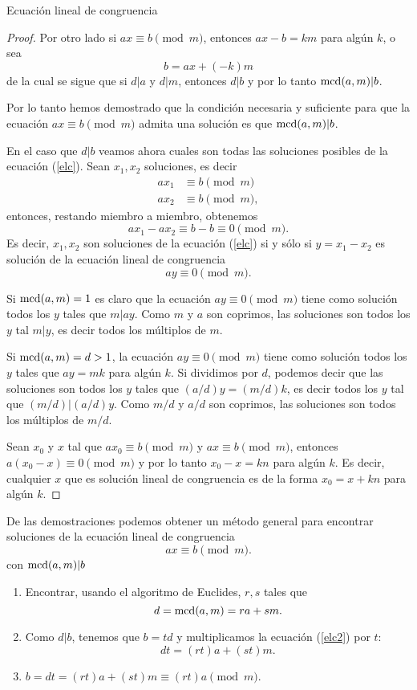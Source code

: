 \begin{section}{Ecuación lineal de congruencia}
\begin{proof}
Por otro lado si $ax\equiv b\pmod{m}$, entonces $ax-b=km$ para
algún $k$, o sea
$$
b=ax+(-k)m
$$
de la cual se sigue que si $d|a$ y $d|m$, entonces $d|b$ y por lo
tanto $\operatorname{mcd}(a,m)|b$.

Por lo tanto hemos demostrado que la condición necesaria y
suficiente para que la ecuación $ax\equiv b \pmod{m}$ admita una
solución es que $\operatorname{mcd}(a,m)|b$.

En el caso que $d|b$ veamos ahora cuales son todas las soluciones posibles de la ecuación (\ref{elc}). Sean $x_1,x_2$ soluciones, es decir
\begin{align*}
ax_1 &\equiv b \pmod{m} \\
ax_2 &\equiv b \pmod{m},
\end{align*}
entonces, restando miembro a miembro, obtenemos
$$
ax_1 -ax_2 \equiv b - b \equiv 0 \pmod{m}.
$$
Es decir, $x_1,x_2$ son soluciones de la ecuación (\ref{elc}) si y sólo si  $y = x_1 -x_2$ es solución de la ecuación lineal de congruencia
\begin{equation}\label{elc0}
ay \equiv 0 \pmod{m}.
\end{equation}

Si $\operatorname{mcd}(a,m) =1$ es claro que la ecuación $ay \equiv 0 \pmod{m}$ tiene como solución todos los $y$ tales que $m|ay$. Como $m$ y $a$ son  coprimos, las soluciones son todos los $y$ tal $m|y$, es decir todos los múltiplos de $m$.

Si $\operatorname{mcd}(a,m) =d > 1$,  la ecuación $ay \equiv 0 \pmod{m}$ tiene como solución todos los $y$ tales que $ay=mk$ para algún $k$. Si dividimos por $d$, podemos decir que las soluciones son todos los $y$ tales que $(a/d)y = (m/d)k$, es decir todos los $y$ tal que $(m/d)|(a/d)y$. Como $m/d$ y $a/d$ son coprimos, las soluciones son todos los múltiplos de $m/d$.

Sean $x_0$ y $x$ tal que $ax_0 \equiv b \pmod{m}$ y $ax \equiv b \pmod{m}$, entonces $a(x_0-x) \equiv 0 \pmod{m}$ y por lo tanto $x_0-x = kn$ para algún $k$. Es decir, cualquier $x$ que es solución lineal de congruencia es de la forma $x_0 = x+kn$ para algún $k$.
\end{proof}

De las demostraciones podemos obtener un método general para encontrar soluciones de la ecuación lineal de congruencia
$$
ax \equiv b \pmod{m}.
$$
con $\operatorname{mcd}(a,m)|b$


\begin{enumerate}[label=(\alph*)]
\item  Encontrar, usando el algoritmo de Euclides, $r,s$ tales que 
\begin{equation}\label{elc2}
d =\operatorname{mcd}(a,m) = ra+sm.
\end{equation}
\item  Como $d|b$, tenemos que $b = td$ y multiplicamos la ecuación (\ref{elc2}) por $t$: $$dt =  (rt)a+(st)m.$$
\item  $b = dt = (rt)a+(st)m \equiv (rt)a \pmod{m}$. 


\end{enumerate}
\end{section}
